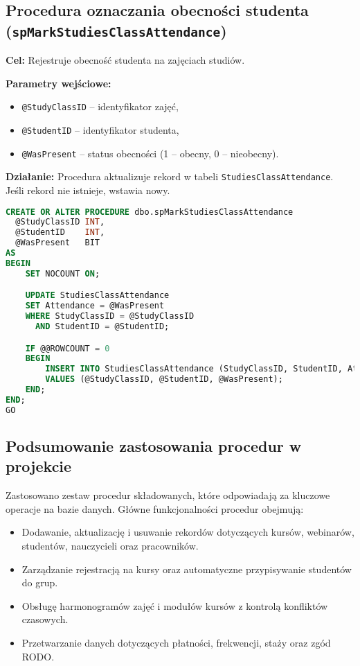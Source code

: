 \documentclass[12pt]{article}
\begin{document}
\newpage
\subsection{Procedura oznaczania obecności studenta (\texttt{spMarkStudiesClassAttendance})}
\textbf{Cel:} Rejestruje obecność studenta na zajęciach studiów.

\textbf{Parametry wejściowe:}
\begin{itemize}
  \item \verb|@StudyClassID| – identyfikator zajęć,
  \item \verb|@StudentID| – identyfikator studenta,
  \item \verb|@WasPresent| – status obecności (1 – obecny, 0 – nieobecny).
\end{itemize}

\textbf{Działanie:} Procedura aktualizuje rekord w tabeli \verb|StudiesClassAttendance|. Jeśli rekord nie istnieje, wstawia nowy.

\begin{lstlisting}[language=SQL]
CREATE OR ALTER PROCEDURE dbo.spMarkStudiesClassAttendance
  @StudyClassID INT,
  @StudentID    INT,
  @WasPresent   BIT
AS
BEGIN
    SET NOCOUNT ON;

    UPDATE StudiesClassAttendance
    SET Attendance = @WasPresent
    WHERE StudyClassID = @StudyClassID
      AND StudentID = @StudentID;

    IF @@ROWCOUNT = 0
    BEGIN
        INSERT INTO StudiesClassAttendance (StudyClassID, StudentID, Attendance)
        VALUES (@StudyClassID, @StudentID, @WasPresent);
    END;
END;
GO
\end{lstlisting}
\subsection{Podsumowanie zastosowania procedur w projekcie}

Zastosowano zestaw procedur składowanych, które odpowiadają za kluczowe operacje na bazie danych. Główne funkcjonalności procedur obejmują:
\begin{itemize}
    \item Dodawanie, aktualizację i usuwanie rekordów dotyczących kursów, webinarów, studentów, nauczycieli oraz pracowników.
    \item Zarządzanie rejestracją na kursy oraz automatyczne przypisywanie studentów do grup.
    \item Obsługę harmonogramów zajęć i modułów kursów z kontrolą konfliktów czasowych.
    \item Przetwarzanie danych dotyczących płatności, frekwencji, staży oraz zgód RODO.
\end{itemize}
\end{document}

